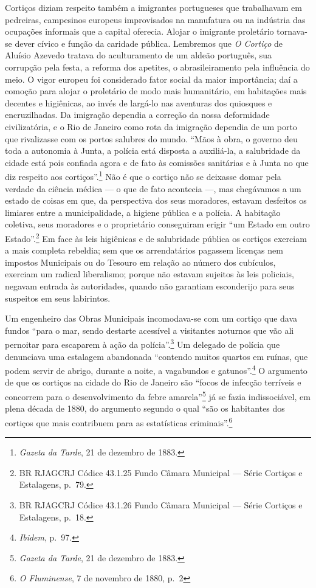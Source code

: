 Cortiços diziam respeito também a imigrantes portugueses que trabalhavam
em pedreiras, campesinos europeus improvisados na manufatura ou na
indústria das ocupações informais que a capital oferecia. Alojar o
imigrante proletário tornava-se dever cívico e função da caridade
pública. Lembremos que \textit{O Cortiço} de Aluísio Azevedo tratava do
aculturamento de um aldeão português, sua corrupção pela festa, a
reforma dos apetites, o abrasileiramento pela influência do meio. O
vigor europeu foi considerado fator social da maior importância; daí a
comoção para alojar o proletário de modo mais humanitário, em habitações
mais decentes e higiênicas, ao invés de largá-lo nas aventuras dos
quiosques e encruzilhadas. Da imigração dependia a correção da nossa
deformidade civilizatória, e o Rio de Janeiro como rota da imigração
dependia de um porto que rivalizasse com os portos salubres do mundo.
``Mãos à obra, o governo deu toda a autonomia à Junta, a polícia está
disposta a auxiliá-la, a salubridade da cidade está pois confiada agora
e de fato às comissões sanitárias e à Junta no que diz respeito aos
cortiços''.\footnote{\textit{Gazeta da Tarde}, 21 de dezembro de 1883.}
Não é que o cortiço não se deixasse domar pela verdade da ciência médica
--- o que de fato acontecia ---, mas chegávamos a um estado de coisas em
que, da perspectiva dos seus moradores, estavam desfeitos os limiares
entre a municipalidade, a higiene pública e a polícia. A habitação
coletiva, seus moradores e o proprietário conseguiram erigir ``um Estado
em outro Estado''.\footnote{BR RJAGCRJ Códice 43.1.25 Fundo Câmara
  Municipal --- Série Cortiços e Estalagens, p.~79.} Em face às leis
higiênicas e de salubridade pública os cortiços exerciam a mais completa
rebeldia; sem que os arrendatários pagassem licenças nem impostos
Municipais ou do Tesouro em relação ao número dos cubículos, exerciam um
radical liberalismo; porque não estavam sujeitos às leis policiais,
negavam entrada às autoridades, quando não garantiam esconderijo para
seus suspeitos em seus labirintos.

Um engenheiro das Obras Municipais incomodava-se com um cortiço que dava
fundos ``para o mar, sendo destarte acessível a visitantes noturnos que
vão ali pernoitar para escaparem à ação da polícia''.\footnote{BR
  RJAGCRJ Códice 43.1.26 Fundo Câmara Municipal --- Série Cortiços e
  Estalagens, p.~18.} Um delegado de polícia que denunciava uma
estalagem abandonada ``contendo muitos quartos em ruínas, que podem
servir de abrigo, durante a noite, a vagabundos e gatunos''.\footnote{\textit{Ibidem},
  p.~97.} O argumento de que os cortiços na cidade do Rio de Janeiro são
``focos de infecção terríveis e concorrem para o desenvolvimento da
febre amarela''\footnote{\textit{Gazeta da Tarde}, 21 de dezembro de 1883.}
já se fazia indissociável, em plena década de 1880, do argumento segundo
o qual ``são os habitantes dos cortiços que mais contribuem para as
estatísticas criminais''.\footnote{\textit{O Fluminense}, 7 de novembro de
  1880, p.~2}

